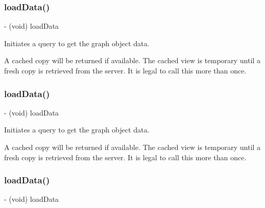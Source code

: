 \subsubsection{\texorpdfstring{load\+Data()}{loadData()}\hspace{0.1cm}{\footnotesize\ttfamily [1/5]}}
{\footnotesize\ttfamily -\/ (void) load\+Data \begin{DoxyParamCaption}{ }\end{DoxyParamCaption}}

Initiates a query to get the graph object data.

A cached copy will be returned if available. The cached view is temporary until a fresh copy is retrieved from the server. It is legal to call this more than once. \mbox{\label{interfaceFBGraphObjectPickerViewController_ad2679fd3904b7d46c40a9c861cd468dc}} 
\subsubsection{\texorpdfstring{load\+Data()}{loadData()}\hspace{0.1cm}{\footnotesize\ttfamily [2/5]}}
{\footnotesize\ttfamily -\/ (void) load\+Data \begin{DoxyParamCaption}{ }\end{DoxyParamCaption}}

Initiates a query to get the graph object data.

A cached copy will be returned if available. The cached view is temporary until a fresh copy is retrieved from the server. It is legal to call this more than once. \mbox{\label{interfaceFBGraphObjectPickerViewController_ad2679fd3904b7d46c40a9c861cd468dc}} 
\subsubsection{\texorpdfstring{load\+Data()}{loadData()}\hspace{0.1cm}{\footnotesize\ttfamily [3/5]}}
{\footnotesize\ttfamily -\/ (void) load\+Data \begin{DoxyParamCaption}{ }\end{DoxyParamCaption}}

